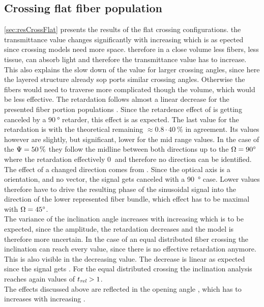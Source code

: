 \subsection{Crossing flat fiber population}
\cref{sec:resCrossFlat} presents the results of the flat crossing configurations.
the transmittance value changes significantly with increasing \modelOmega{} which is as epected since crossing models need more space.
therefore in a close volume less fibers, \ie{} less tissue, can absorb light and therefore the transmittance value has to increase.
This also explains the slow down of the value for larger crossing angles, since here the layered structure already sop ports similar crossing angles.
Otherwise the fibers would need to traverse more complicated though the volume, which would be less effective.
% 
The retardation follows almost a linear decrease for the presented fiber portion populations \modelPsi{}.
Since the retardence effect of is getting canceled by a $\SI{90}{\degree}$ retarder, this effect is as expected.
The last value for the retardation is with the theoretical remaining $\approx0.8\cdot \SI{40}{\percent}$ in agreement.
Its values however are slightly, but significant, lower for the mid range \trel{} values.
In the case of the $\textnormal{$\Psi$}{} = \SI{50}{\percent}$ they follow the midline between both directions up to the $\textnormal{$\Omega$}=\SI{90}{\degree}$ where the retardation effectively $\SI{0}{}$ and therefore no direction can be identified.
\\
% 
The effect of a changed direction comes from \dummy{}. 
Since the optical axis is a orientation, and no vector, the signal gets canceled with a \SI{90}{\degree} case.
Lower values therefore have to drive the resulting phase of the sinusoidal signal into the direction of the lower represented fiber bundle, which effect has to be maximal with $\textnormal{$\Omega$}=\SI{45}{\degree}$. 
\\
% 
The variance of the inclination angle increases with increasing \modelOmega{} which is to be expected, since the amplitude, \ie{} the retardation decreases and the model is therefore more uncertain.
In the case of an equal distributed fiber crossing the inclination can reach every value, since there is no effective retardation anymore.
\\
%
This is also visible in the decreasing \trel{} value.
The decrease is linear as expected \dummy[really?]{} since the signal gets \dummy{}.
For the equal distributed crossing the inclination analysis reaches again values of $\textnormal{$t_\mathit{rel}$}>1$.
\\
% 
The effects discussed above are reflected in the opening angle \modelDOmega{}, which has to increases with increasing \modelOmega{}.
% 
